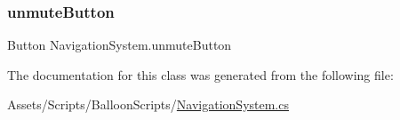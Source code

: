 \mbox{\label{classNavigationSystem_aafe727ba79eb80a77896f1a86847821a}} 
\subsubsection{\texorpdfstring{unmute\+Button}{unmuteButton}}
{\footnotesize\ttfamily Button Navigation\+System.\+unmute\+Button}



The documentation for this class was generated from the following file\+:\begin{DoxyCompactItemize}
\item 
Assets/\+Scripts/\+Balloon\+Scripts/\hyperlink{NavigationSystem_8cs}{Navigation\+System.\+cs}\end{DoxyCompactItemize}
